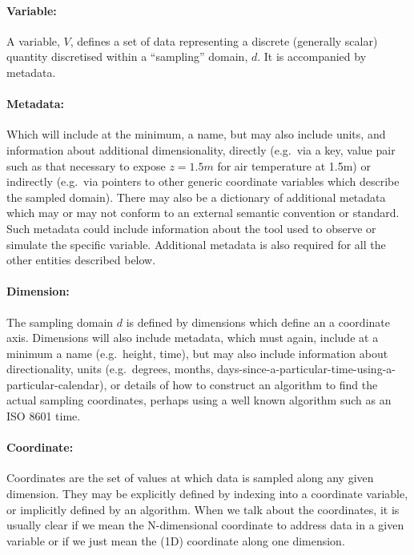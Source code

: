 \paragraph{Variable:}%
\label{variable}

A variable, \(V\), defines a set of data representing a discrete (generally scalar) quantity discretised within a ``sampling'' domain, \(d\). It is accompanied by metadata.

\paragraph{Metadata:}%
\label{metadata}

Which will include at the minimum, a name, but may also include units, and information about additional dimensionality, directly (e.g.~via a key, value pair such as that necessary to expose \(z=1.5m\) for air temperature at 1.5m) or indirectly (e.g.~via pointers to other generic coordinate variables which describe the sampled domain). 
There may also be a dictionary of additional metadata which may or may not conform to an external semantic convention or standard. 
Such metadata could include information about the tool used to observe or simulate the specific variable. 
Additional metadata is also required for all the other entities described below.

\paragraph{Dimension:}%
\label{dimension}

The sampling domain \(d\) is defined by dimensions which define an a coordinate axis. 
Dimensions will also include metadata, which must again, include at a minimum a name (e.g.~height, time), but may also include information about directionality, units (e.g.~degrees, months, days-since-a-particular-time-using-a-particular-calendar), or details of how to construct an algorithm to find the actual sampling coordinates, perhaps using a well known algorithm such as an ISO 8601 time.

\paragraph{Coordinate:}%
\label{coordinate}

Coordinates are the set of values at which data is sampled along any given dimension. 
They may be explicitly defined by indexing into a coordinate variable, or implicitly defined by an algorithm. 
When we talk about the coordinates, it is usually clear if we mean the N-dimensional coordinate to address data in a given variable or if we just mean the (1D) coordinate along one dimension.

